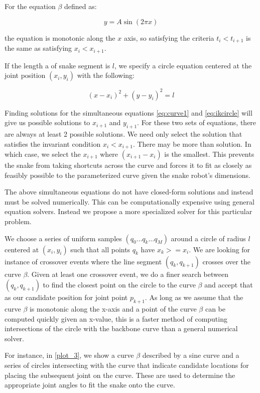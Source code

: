 For the equation $\beta$ defined as:


\begin{equation}
\label{eq:curve1}
y = A\sin(2\pi x)
\end{equation}


the equation is monotonic along the $x$ axis, so satisfying the criteria $t_i < t_{i+1}$ is the same as satisfying $x_i < x_{i+1}$. 

If the length a of snake segment is $l$, we specify a circle equation centered at the joint position $(x_i,y_i)$ with the following:


\begin{equation}
\label{eq:IKcircle}
(x-x_i)^2 + (y-y_i)^2 = l
\end{equation}


Finding solutions for the simultaneous equations \autoref{eq:curve1} and \autoref{eq:ikcircle} will give us possible solutions to $x_{i+1}$ and $y_{i+1}$. For these two sets of equations, there are always at least 2 possible solutions. We need only select the solution that satisfies the invariant condition $x_i < x_{i+1}$. There may be more than solution. In which case, we select the $x_{i+1}$ where $(x_{i+1}-x_i)$ is the smallest. This prevents the snake from taking shortcuts across the curve and forces it to fit as closely as feasibly possible to the parameterized curve given the snake robot's dimensions.

The above simultaneous equations do not have closed-form solutions and instead must be solved numerically. This can be computationally expensive using general equation solvers. Instead we propose a more specialized solver for this particular problem.

We choose a series of uniform samples $(q_0 ... q_k ... q_M)$ around a circle of radius $l$ centered at $(x_i,y_i)$ such that all points $q_k$ have $x_k >= x_i$. We are looking for instance of crossover events where the line segment $(q_k,q_{k+1})$ crosses over the curve $\beta$. Given at least one crossover event, we do a finer search between $(q_k, q_{k+1})$ to find the closest point on the circle to the curve $\beta$ and accept that as our candidate position for joint point $p_{k+1}$. As long as we assume that the curve $\beta$ is monotonic along the x-axis and a point of the curve $\beta$ can be computed quickly given an x-value, this is a faster method of computing intersections of the circle with the backbone curve than a general numerical solver.

For instance, in \autoref{plot_3}, we show a curve $\beta$ described by a sine curve and a series of circles intersecting with the curve that indicate candidate locations for placing the subsequent joint on the curve. These are used to determine the appropriate joint angles to fit the snake onto the curve.

